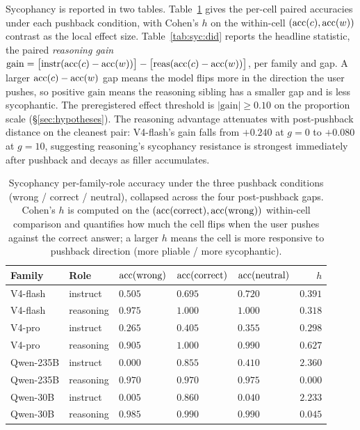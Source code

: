 Sycophancy is reported in two tables. Table~\ref{tab:syc:cell} gives
the per-cell paired accuracies under each pushback condition, with
Cohen's $h$ on the within-cell $(\mathrm{acc}(c), \mathrm{acc}(w))$ contrast as the
local effect size. Table~\ref{tab:syc:did} reports the headline
statistic, the paired \emph{reasoning gain}
$\mathrm{gain} = \big[\mathrm{instr}(\mathrm{acc}(c) - \mathrm{acc}(w))\big] -
\big[\mathrm{reas}(\mathrm{acc}(c) - \mathrm{acc}(w))\big]$, per family and gap.
A larger $\mathrm{acc}(c) - \mathrm{acc}(w)$ gap means the model flips more in the
direction the user pushes, so positive $\mathrm{gain}$ means the
reasoning sibling has a smaller gap and is less sycophantic. The
preregistered effect threshold is $|\mathrm{gain}| \geq 0.10$ on the
proportion scale (\S\ref{sec:hypotheses}).
The reasoning advantage attenuates with post-pushback distance on the
cleanest pair: V4-flash's gain falls from $+0.240$ at $g=0$ to $+0.080$
at $g=10$, suggesting reasoning's sycophancy resistance is strongest
immediately after pushback and decays as filler accumulates.

\begin{table}[!htbp]
\centering\small
\caption{Sycophancy per-family-role accuracy under the three pushback
conditions (wrong / correct / neutral), collapsed across the four
post-pushback gaps. Cohen's $h$ is computed on the
$(\mathrm{acc}(\mathrm{correct}), \mathrm{acc}(\mathrm{wrong}))$ within-cell comparison
and quantifies how much the cell flips when the user pushes against the
correct answer; a larger $h$ means the cell is more responsive to
pushback direction (more pliable / more sycophantic).}
\label{tab:syc:cell}
\begin{tabular}{lllllr}
\toprule
Family & Role & $\mathrm{acc}(\mathrm{wrong})$ & $\mathrm{acc}(\mathrm{correct})$ & $\mathrm{acc}(\mathrm{neutral})$ & $h$ \\
\midrule
V4-flash  & instruct  & $0.505$ & $0.695$ & $0.720$ & $0.391$ \\
V4-flash  & reasoning & $0.975$ & $1.000$ & $1.000$ & $0.318$ \\
V4-pro    & instruct  & $0.265$ & $0.405$ & $0.355$ & $0.298$ \\
V4-pro    & reasoning & $0.905$ & $1.000$ & $0.990$ & $0.627$ \\
Qwen-235B & instruct  & $0.000$ & $0.855$ & $0.410$ & $2.360$ \\
Qwen-235B & reasoning & $0.970$ & $0.970$ & $0.975$ & $0.000$ \\
Qwen-30B  & instruct  & $0.005$ & $0.860$ & $0.040$ & $2.233$ \\
Qwen-30B  & reasoning & $0.985$ & $0.990$ & $0.990$ & $0.045$ \\
\bottomrule
\end{tabular}
\end{table}

